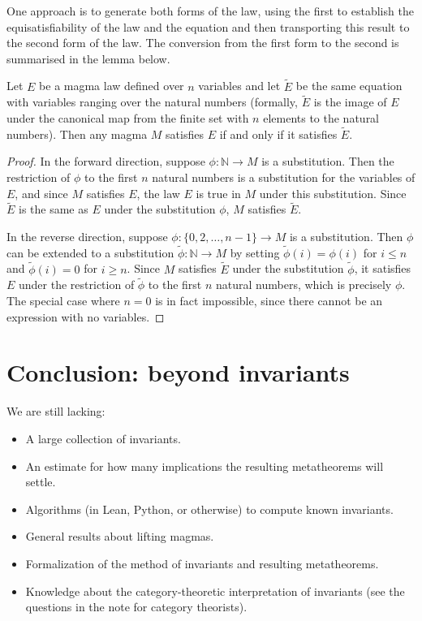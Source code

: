 One approach is to generate both forms of the law, using the first to establish the equisatisfiability of the law and the equation and then transporting this result to the second form of the law. The conversion from the first form to the second is summarised in the lemma below.

\begin{lemma}\label{compatibility-between-magma-laws}
	Let $E$ be a magma law defined over $n$ variables and let $\tilde{E}$ be the same equation with variables ranging over the natural numbers (formally, $\tilde{E}$ is the image of $E$ under the canonical map from the finite set with $n$ elements to the natural numbers). Then any magma $M$ satisfies $E$ if and only if it satisfies $\tilde{E}$.
\end{lemma}

\begin{proof}
	In the forward direction, suppose $\phi : \mathbb{N} \to M$ is a substitution. Then the restriction of $\phi$ to the first $n$ natural numbers is a substitution for the variables of $E$, and since $M$ satisfies $E$, the law $E$ is true in $M$ under this substitution. Since $\tilde{E}$ is the same as $E$ under the substitution $\phi$, $M$ satisfies $\tilde{E}$.

	In the reverse direction, suppose $\phi : \{0, 2, \ldots, n-1\} \to M$ is a substitution. Then $\phi$ can be extended to a substitution $\tilde{\phi} : \mathbb{N} \to M$ by setting $\tilde{\phi}(i) = \phi(i)$ for $i \leq n$ and $\tilde{\phi}(i) = 0$ for $i \geq n$. Since $M$ satisfies $\tilde{E}$ under the substitution $\tilde{\phi}$, it satisfies $E$ under the restriction of $\tilde{\phi}$ to the first $n$ natural numbers, which is precisely $\phi$. The special case where $n = 0$ is in fact impossible, since there cannot be an expression with no variables.
\end{proof}

\section{Conclusion: beyond invariants}
We are still lacking:
\begin{itemize}
	\item A large collection of invariants.
	\item An estimate for how many implications the resulting metatheorems will settle.
	\item Algorithms (in Lean, Python, or otherwise) to compute known invariants.
	\item General results about lifting magmas.
	\item Formalization of the method of invariants and resulting metatheorems.
	\item Knowledge about the category-theoretic interpretation of invariants (see the questions in the note for category theorists).
\end{itemize}

